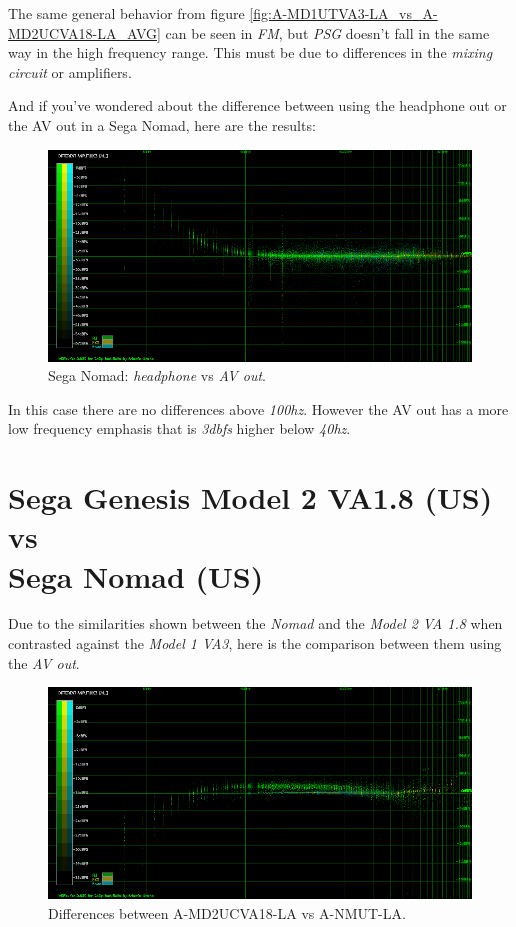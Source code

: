 \documentclass[10pt,a4paper]{report}
\newcommand{\hz}[1]{\textit{#1\acrshort{hz}}}
\newcommand{\db}[1]{\textit{#1\acrshort{dbfs}}}
\begin{document}
The same general behavior from figure \ref{fig:A-MD1UTVA3-LA_vs_A-MD2UCVA18-LA_AVG} can be seen in \textit{FM}, but \textit{PSG} doesn't fall in the same way in the high frequency range. This must be due to differences in the \textit{mixing circuit} or amplifiers.

And if you've wondered about the difference between using the headphone out or the AV out in a Sega Nomad, here are the results:

\begin{figure}[H]
	\centering
	\includegraphics[width=1.0\linewidth]{images/results/6-A-NMUT-LA_vs_A-NMUT-AV-LA.png}
	\caption[A-NMUT-LA vs A-NMUT-AV-LA]{Sega Nomad: \textit{headphone} vs \textit{AV out}.}
	\label{fig:A-NMUT-LA_vs_A-NMUT-AV-LA}
\end{figure}

In this case there are no differences above \hz{100}. However the AV out has a more low frequency emphasis that is \db{3} higher below \hz{40}.

\section{Sega Genesis Model 2 VA1.8 (US) vs\\ Sega Nomad (US)}

Due to the similarities shown between the \textit{Nomad} and the \textit{Model 2 VA 1.8} when contrasted against the \textit{Model 1 VA3}, here is the comparison between them using the \textit{AV out}.

\begin{figure}[H]
	\centering
	\includegraphics[width=1.0\linewidth]{images/results/7-A-MD2UCVA18-LA_vs_A-NMUT-LA.png}
	\caption[9-A-MD2UCVA18-LA vs A-NMUT-LA]{Differences between A-MD2UCVA18-LA vs A-NMUT-LA.}
	\label{fig:A-MD2UCVA18-LA_vs_A-NMUT-LA}
\end{figure}
\end{document}
